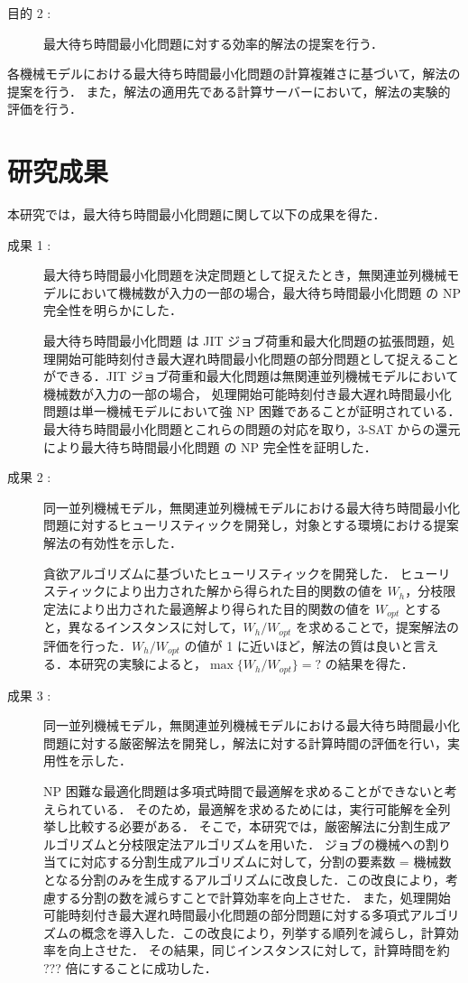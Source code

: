 \documentclass[12pt]{optlab-bachelor}
\begin{document}
\begin{description}
  \item[目的 2 :]
  最大待ち時間最小化問題に対する効率的解法の提案を行う．
\end{description}

各機械モデルにおける最大待ち時間最小化問題の計算複雑さに基づいて，解法の提案を行う．
また，解法の適用先である計算サーバーにおいて，解法の実験的評価を行う．

\section{研究成果}
本研究では，最大待ち時間最小化問題に関して以下の成果を得た．
\begin{description}
  \item[成果 1 :]
  最大待ち時間最小化問題を決定問題として捉えたとき，無関連並列機械モデルにおいて機械数が入力の一部の場合，最大待ち時間最小化問題 の NP 完全性を明らかにした．

  最大待ち時間最小化問題 は JIT ジョブ荷重和最大化問題の拡張問題，処理開始可能時刻付き最大遅れ時間最小化問題の部分問題として捉えることができる．JIT ジョブ荷重和最大化問題は無関連並列機械モデルにおいて機械数が入力の一部の場合， 処理開始可能時刻付き最大遅れ時間最小化問題は単一機械モデルにおいて強 NP 困難であることが証明されている．最大待ち時間最小化問題とこれらの問題の対応を取り，\textsc{3-SAT} からの還元により最大待ち時間最小化問題 の NP 完全性を証明した．

  \item[成果 2 :]
  同一並列機械モデル，無関連並列機械モデルにおける最大待ち時間最小化問題に対するヒューリスティックを開発し，対象とする環境における提案解法の有効性を示した．

  貪欲アルゴリズムに基づいたヒューリスティックを開発した．
  ヒューリスティックにより出力された解から得られた目的関数の値を $W_h$，分枝限定法により出力された最適解より得られた目的関数の値を $W_{opt}$ とすると，異なるインスタンスに対して，$W_h/W_{opt}$ を求めることで，提案解法の評価を行った．$W_h/W_{opt}$ の値が 1 に近いほど，解法の質は良いと言える．本研究の実験によると，$\max\big\{W_h/W_{opt}\big\} = ?$ の結果を得た．

  \item[成果 3 :]
  同一並列機械モデル，無関連並列機械モデルにおける最大待ち時間最小化問題に対する厳密解法を開発し，解法に対する計算時間の評価を行い，実用性を示した．

  NP 困難な最適化問題は多項式時間で最適解を求めることができないと考えられている．
  そのため，最適解を求めるためには，実行可能解を全列挙し比較する必要がある．
  そこで，本研究では，厳密解法に分割生成アルゴリズムと分枝限定法アルゴリズムを用いた．
  ジョブの機械への割り当てに対応する分割生成アルゴリズムに対して，分割の要素数 = 機械数 となる分割のみを生成するアルゴリズムに改良した．この改良により，考慮する分割の数を減らすことで計算効率を向上させた．
  また，処理開始可能時刻付き最大遅れ時間最小化問題の部分問題に対する多項式アルゴリズムの概念を導入した．この改良により，列挙する順列を減らし，計算効率を向上させた．
  その結果，同じインスタンスに対して，計算時間を約 ??? 倍にすることに成功した．

\end{description}
\end{document}
